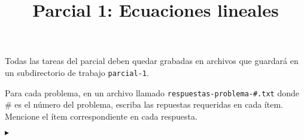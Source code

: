 \documentclass[12pt, parcial]{vexam_aegis}
\title{Parcial 1: Ecuaciones lineales}
\newenvironment{recomendaciones}[1]{%
       \itshape \bfseries
       \leavevmode\color{#1}\ignorespaces%
       }{\mdseries \upshape \vspace{1cm}}
\newcounter{ejnro}
\newenvironment{ejj}[1]%
{\addtocounter{ejnro}{1}\hspace{-1.2cm}$\blacktriangleright$\hspace{.3cm}{\textbf{\arabic{ejnro}.}}\hspace{.3cm}}%
{\vspace{5pt}}
\begin{document}
                            
 
\maketitle

\begin{recomendaciones}{charcoal}

Todas las tareas del parcial deben quedar grabadas en archivos
que guardará en un subdirectorio de trabajo {\tt parcial-1}.

Para cada problema, en un archivo llamado {\tt respuestas-problema-\#.txt}
donde \# es el número del problema,
escriba las repuestas requeridas en cada ítem.
Mencione el ítem correspondiente en cada respuesta. 
 
\end{recomendaciones}



   \begin{ejj}

      \VAR{ej}

   \end{ejj}

\end{document}
